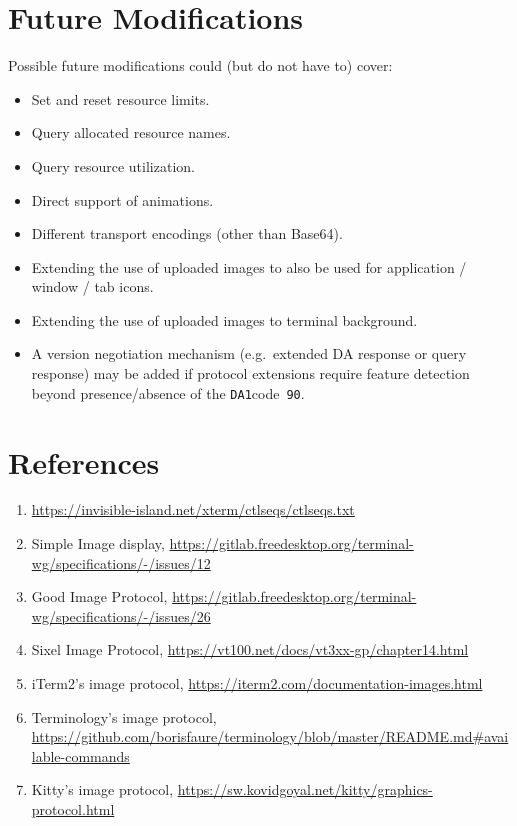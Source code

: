 \documentclass[a4paper]{article}
\newcommand{\code}[1]{\colorbox{light-gray}{\texttt{#1}}}
\newcommand{\DA}{\code{DA1}}
\begin{document}
\section{Future Modifications} %

Possible future modifications could (but do not have to) cover:

\begin{itemize}
    \item Set and reset resource limits.
    \item Query allocated resource names.
    \item Query resource utilization.
    \item Direct support of animations.
    \item Different transport encodings (other than Base64).
    \item Extending the use of uploaded images to also be used for application / window / tab icons.
    \item Extending the use of uploaded images to terminal background.
    \item A version negotiation mechanism (e.g.\ extended DA response or query response)
        may be added if protocol extensions require feature detection
        beyond presence/absence of the \DA code~\code{90}.
\end{itemize}

\section{References} %

\begin{enumerate}
    \item \label{ref:ctlseqs}\url{https://invisible-island.net/xterm/ctlseqs/ctlseqs.txt}
    \item \label{ref:twg-simple-image-display}Simple Image display, \url{https://gitlab.freedesktop.org/terminal-wg/specifications/-/issues/12}
    \item \label{ref:twg-gip}Good Image Protocol, \url{https://gitlab.freedesktop.org/terminal-wg/specifications/-/issues/26}
    \item \label{ref:image-sixel}Sixel Image Protocol, \url{https://vt100.net/docs/vt3xx-gp/chapter14.html}
    \item \label{ref:image-item2}iTerm2's image protocol, \url{https://iterm2.com/documentation-images.html}
    \item \label{ref:image-terminology}Terminology's image protocol, \url{https://github.com/borisfaure/terminology/blob/master/README.md#available-commands}
    \item \label{ref:image-kitty}Kitty's image protocol, \url{https://sw.kovidgoyal.net/kitty/graphics-protocol.html}
\end{enumerate}
\end{document}
